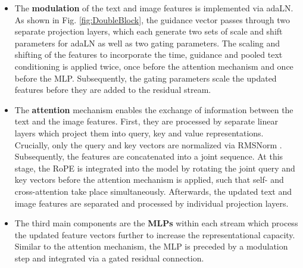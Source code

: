 \begin{itemize}


\item The \textbf{modulation} of the text and image features is implemented via \gls{adaLN}. As shown in Fig. \ref{fig:DoubleBlock}, the guidance vector passes through two separate projection layers, which each generate two sets of scale and shift parameters for \gls{adaLN}  as well as two gating parameters. The scaling and shifting of the features to incorporate the time, guidance and pooled text conditioning is applied twice, once before the attention mechanism and once before the \gls{MLP}. Subsequently, the gating parameters scale the updated features before they are added to the residual stream. 


\item The \textbf{attention} mechanism enables the exchange of information between the text and the image features. First, they are processed by separate linear layers which project them into query, key and value representations. Crucially, only the query and key vectors are normalized via \gls{RMSNorm} \cite{RMSNorm}. Subsequently, the features are concatenated into a joint sequence. At this stage, the \gls{RoPE} is integrated into the model by rotating the joint query and key vectors before the attention mechanism is applied, such that self- and cross-attention take place simultaneously. Afterwards, the updated text and image features are separated and processed by individual projection layers. 

\item The third main components are the \textbf{\gls{MLP}s} within each stream which process the updated feature vectors further to increase the representational capacity. Similar to the attention mechanism, the MLP is preceded by a modulation step and integrated via a gated residual connection.

\end{itemize}


